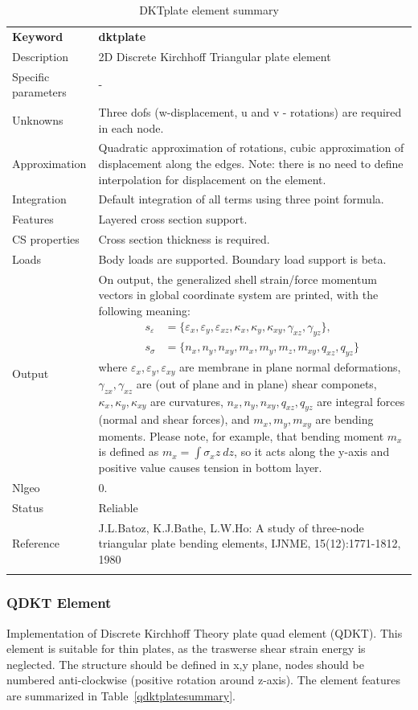 \documentclass[a4paper]{article}
\newcommand{\param}[1]{\texttt{#1}} %
\newcommand{\templabel}{}%
\newcommand{\tempcaption}{}%
\newcounter{nelpar}
\newenvironment{elementsummary}[5]{%
  \gdef\tempcaption{#4}%
  \gdef\templabel{#5}%
  \setcounter{nelpar}{0}%
  \begin{center} %
    \begin{table}[!htb] %
      \begin{tabular}{|l|p{9cm}|}\hline %
        {\bf Keyword} & \bf{#1}\\ %
        {Description} & {#2}\\ %
        {Specific parameters} & {#3}\\ \hline %
}{
  \\ \hline %
      \end{tabular}%
      \caption{\tempcaption}%
      \label{\templabel}%
    \end{table}%
  \end{center}%
}
\newcommand{\elementParam}[1]{%
  \ifthenelse{\value{nelpar}>0} %
             {&{#1}}%
             {\setcounter{nelpar}{1}Parameters&{#1}}%
             \\%
}
\newcommand{\elementDescription}[2]{{#1} & {#2}\\}
\begin{document}
\begin{elementsummary}{dktplate}{2D Discrete Kirchhoff Triangular plate element}{-}{DKTplate element summary}{dktplatesummary}
\elementDescription{Unknowns}{Three dofs (w-displacement, u and v - rotations) are required in each node.}
\elementDescription{Approximation}{Quadratic approximation of rotations, cubic approximation of displacement along the edges. Note: there is no need to define interpolation for displacement on the element.}
\elementDescription{Integration}{Default integration of all terms using three point formula.}
\elementDescription{Features}{Layered cross section support.}
\elementDescription{CS properties}{Cross section thickness is required.}
\elementDescription{Loads}{Body loads are supported. Boundary load support is beta.}
\elementDescription{Output}{On output, the generalized shell strain/force momentum vectors in global coordinate system are printed, with the following meaning:
\begin{align*}
s_{\varepsilon} &= \{\varepsilon_x, \varepsilon_y, \varepsilon_{xz}, \kappa_x, \kappa_y, \kappa_{xy}, \gamma_{xz}, \gamma_{yz}\},\\
s_{\sigma} &= \{n_x, n_y, n_{xy}, m_x, m_y, m_z, m_{xy}, q_{xz}, q_{yz}\}
\end{align*}
where $\varepsilon_x, \varepsilon_y, \varepsilon_{xy}$ are membrane in plane normal deformations, $\gamma_{zx}, \gamma_{xz}$ are (out of plane and in plane) shear componets, $\kappa_x, \kappa_y, \kappa_{xy}$ are curvatures, $n_x, n_y, n_{xy}, q_{xz}, q_{yz}$ are integral forces (normal and shear forces), and $m_x, m_y, m_{xy}$ are bending moments. 
Please note, for example, that bending moment $m_x$ is defined as $m_x=\int \sigma_x z\ dz$, so it acts along the y-axis and positive value causes tension in bottom layer.}
\elementDescription{Nlgeo}{0.}
\elementDescription{Status}{Reliable}
\elementDescription{Reference}{J.L.Batoz, K.J.Bathe, L.W.Ho: A study of three-node triangular plate bending elements, IJNME, 15(12):1771-1812, 1980}
\end{elementsummary}


\subsubsection {QDKT Element}
\label{qdkt}
Implementation of Discrete Kirchhoff Theory plate quad element (QDKT).
This element is suitable for thin plates, as the traswerse shear strain energy is neglected.
The structure should be defined in x,y plane, nodes should be numbered anti-clockwise (positive rotation around
z-axis). The element features are summarized in Table~\ref{qdktplatesummary}.
\end{document}

